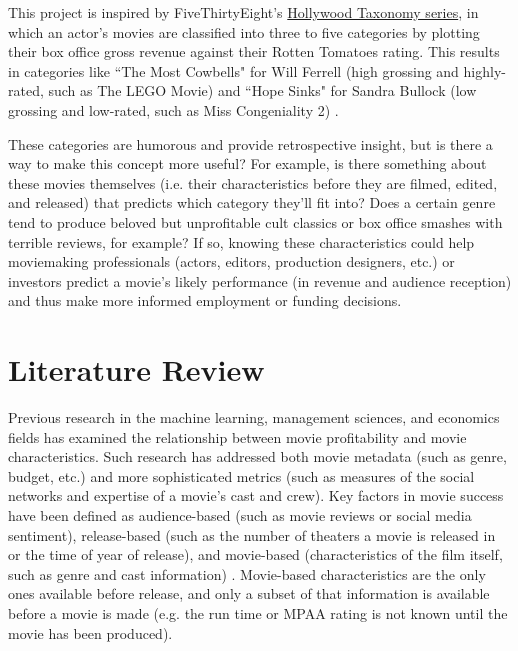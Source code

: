 \documentclass[12pt,english]{article}
\begin{document}
This project is inspired by FiveThirtyEight's \href{https://fivethirtyeight.com/tag/hollywood-taxonomy/}{Hollywood Taxonomy series}, in which an actor's movies are classified into three to five categories by plotting their box office gross revenue against their Rotten Tomatoes rating. This results in categories like ``The Most Cowbells" for Will Ferrell (high grossing and highly-rated, such as The LEGO Movie) and ``Hope Sinks" for Sandra Bullock (low grossing and low-rated, such as Miss Congeniality 2) \citep{ferrell, bullock}. 

These categories are humorous and provide retrospective insight, but is there a way to make this concept more useful? For example, is there something about these movies themselves (i.e. their characteristics before they are filmed, edited, and released) that predicts which category they'll fit into? Does a certain genre tend to produce beloved but unprofitable cult classics or box office smashes with terrible reviews, for example? If so, knowing these characteristics could help moviemaking professionals (actors, editors, production designers, etc.) or investors predict a movie's likely performance (in revenue and audience reception) and thus make more informed employment or funding decisions.

\section{Literature Review}
Previous research in the machine learning, management sciences, and economics fields has examined the relationship between movie profitability and movie characteristics. Such research has addressed both movie metadata (such as genre, budget, etc.) and more sophisticated metrics (such as measures of the social networks and expertise of a movie's cast and crew). Key factors in movie success have been defined as audience-based (such as movie reviews or social media sentiment), release-based (such as the number of theaters a movie is released in or the time of year of release), and movie-based (characteristics of the film itself, such as genre and cast information) \citep{lash}. Movie-based characteristics are the only ones available before release, and only a subset of that information is available before a movie is made (e.g. the run time or MPAA rating is not known until the movie has been produced).
\end{document}
